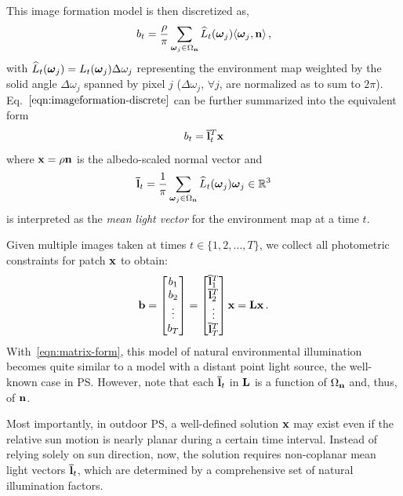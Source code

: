 This image formation model is then discretized as,
%
\begin{equation}
b_t = \frac{\rho}{\pi}\sum_{\boldsymbol \omega_j \in \Omega_{\bf n}} \widehat{L}_t(\boldsymbol \omega_j) \langle \boldsymbol \omega_j, {\bf n} \rangle\,,
\label{eqn:imageformation-discrete}
\end{equation}
%
with $\widehat{L}_t(\boldsymbol \omega_j) = L_t(\boldsymbol \omega_j)\Delta\omega_j$ representing the environment map weighted by the solid angle $\Delta\omega_j$ spanned by pixel $j$ ($\Delta\omega_j$, $\forall j$, are normalized as to sum to $2\pi$). Eq.~$\eqref{eqn:imageformation-discrete}$ can be further summarized into the equivalent form
%
\begin{equation}
b_t = {\bf \bar l}_t^T \mathbf{x}
\label{eqn:imageformation-simplified}
\end{equation}
where ${\bf x} = \rho {\bf n}$ is the albedo-scaled normal vector and
\begin{equation}
{\bf \bar l}_t = \frac{1}{\pi} \sum_{\boldsymbol \omega_j \in \Omega_{\bf n}} \widehat{L}_t(\boldsymbol \omega_j) \boldsymbol \omega_j \in \mathbb{R}^3
\label{eqn:mean-light}
\end{equation}
is interpreted as the {\em mean light vector} for the environment map at a time $t$.

Given multiple images taken at times $t \in \{1,2,\ldots,T\}$, we collect all photometric constraints for patch ${\bf x}$ to obtain:
\begin{equation}
\mathbf{b} =
\begin{bmatrix}
 b_1 \\ b_2 \\ \vdots \\ b_T
\end{bmatrix}
=
\begin{bmatrix}
 {\bf \bar l}_1^T \\ {\bf \bar l}_2^T \\ \vdots \\ {\bf \bar l}_T^T
\end{bmatrix}
{\bf x} = \mathbf{L} \mathbf{x} \,.
\label{eqn:matrix-form}
\end{equation}
With~\eqref{eqn:matrix-form}, this model of natural environmental illumination becomes quite similar to a model with a distant point light source, the well-known case in PS. However, note that each ${\bf \bar l}_t$ in ${\bf L}$ is a function of $\Omega_{\bf n}$ and, thus, of ${\bf n}$.

Most importantly, in outdoor PS, a well-defined solution ${\bf x}$ may exist even if the relative sun motion is nearly planar during a certain time interval. Instead of relying solely on sun direction, now, the solution requires non-coplanar mean light vectors ${\bf \bar l}_t$, which are determined by a comprehensive set of natural illumination factors.

